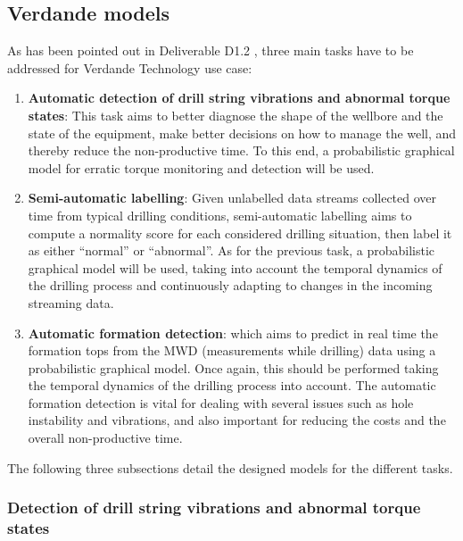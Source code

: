 
\subsection{Verdande models} \label{Section:VerdandeModels}

As has been pointed out in Deliverable D1.2 \cite{Fer14b}, three main tasks have to be addressed for Verdande Technology use case:

\begin{enumerate}
\item \textbf{Automatic detection of drill string vibrations and abnormal torque states}: This task aims to better diagnose the shape of the wellbore and the state of the equipment, make better decisions on how to manage the well, and thereby reduce the non-productive time. To this end, a probabilistic graphical model for erratic torque monitoring and detection will be used.

\item \textbf{Semi-automatic labelling}: Given unlabelled data streams collected over time from typical drilling conditions, semi-automatic labelling aims to compute a normality score for each considered drilling situation, then label it as either ``normal'' or ``abnormal''. As for the previous task, a probabilistic graphical model will be used, taking into account the temporal dynamics of the drilling process and continuously adapting to changes in the incoming streaming data. 

\item \textbf{Automatic formation detection}: which aims to predict in real time the formation tops from the MWD (measurements while drilling) data using a probabilistic graphical model. Once again, this should be performed taking the temporal dynamics of the drilling process into account. The automatic formation detection is vital for dealing with several issues such as hole instability and vibrations, and also important for reducing the costs and the overall non-productive time.
\end{enumerate}

The following three subsections detail the designed models for the different tasks.

\subsubsection{Detection of drill string vibrations and abnormal torque states}\label{SubSection:DetectionTorque}

